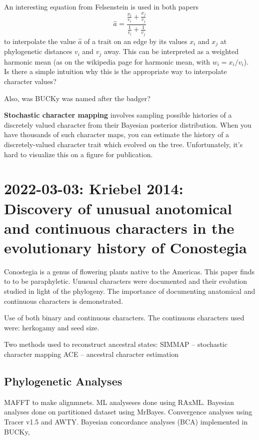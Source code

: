 \documentclass{article}
\begin{document}
An interesting equation from Felsenstein is used in both papers
\begin{equation*}
  \hat{a}= \frac
  {\frac{x_{i}}{v_{i}}+ \frac{x_{j}}{v_{j}}}
  {\frac{1}{v_{i}}+\frac{1}{v_{j}}}
\end{equation*}
to interpolate the value $\hat{a}$ of a trait on an edge by its values $x_{i}$
and $x_{j}$ at phylogenetic distances $v_{i}$ and $v_{j}$ away. This can be
interpreted as a weighted harmonic mean (as on the wikipedia page for harmonic
mean, with $w_{i}=x_{i}/v_{i}$). Is there a simple intuition why this is the
appropriate way to interpolate character values?

Also, was BUCKy was named after the badger?

\textbf{Stochastic character mapping} involves sampling possible histories of a
discretely valued character from their Bayesian posterior distribution. When you
have thousands of such character maps, you can estimate the history of a
discretely-valued character trait which evolved on the tree. Unfortunately, it's
hard to visualize this on a figure for publication.


\section{2022-03-03: Kriebel 2014: Discovery of unusual anotomical and
  continuous characters in the evolutionary history of Conostegia}

Conostegia is a genus of flowering plants native to the Americas. This paper
finds to to be paraphyletic. Unusual characters were documented and their
evolution studied in light of the phylogeny. The importance of documenting
anatomical and continuous characters is demonstrated.

Use of both binary and continuous characters. The continuous characters used were: herkogamy and seed size.

Two methods used to reconstruct ancestral states:
SIMMAP -- stochastic character mapping
ACE -- ancestral character estimation

\subsection{Phylogenetic Analyses}
MAFFT to make alignmnets. ML analyseses done using RAxML. Bayesian analyses done
on partitioned dataset using MrBayes. Convergence analyses using Tracer v1.5 and
AWTY. Bayesian concordance analyses (BCA) implemented in BUCKy,
\end{document}
